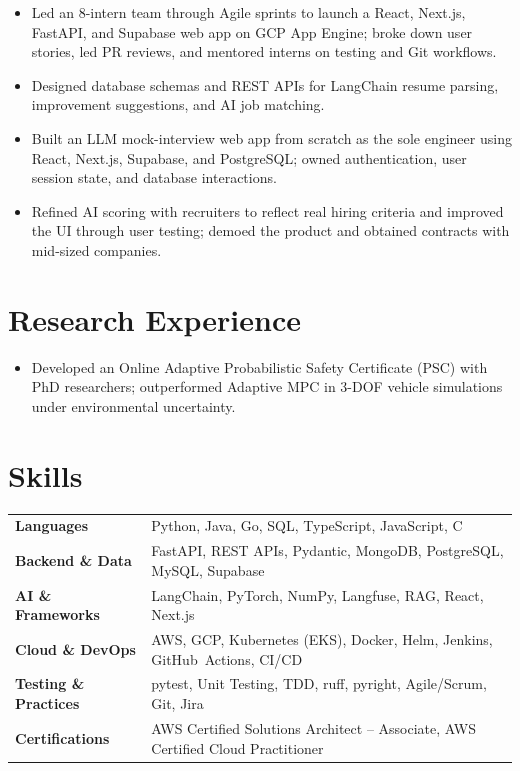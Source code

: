 \documentclass[11pt, letterpaper]{article}
\begin{document}
\begin{itemize}
  \item Led an 8-intern team through Agile sprints to launch a React, Next.js, FastAPI, and Supabase web app on GCP App Engine; broke down user stories, led PR reviews, and mentored interns on testing and Git workflows.
  \item Designed database schemas and REST APIs for LangChain resume parsing, improvement suggestions, and AI job matching.
\end{itemize}

\begin{itemize}
  \item Built an LLM mock-interview web app from scratch as the sole engineer using React, Next.js, Supabase, and PostgreSQL; owned authentication, user session state, and database interactions.
  \item Refined AI scoring with recruiters to reflect real hiring criteria and improved the UI through user testing; demoed the product and obtained contracts with mid-sized companies.
\end{itemize}

\section{Research Experience}
\begin{itemize}
  \item Developed an Online Adaptive Probabilistic Safety Certificate (PSC) with PhD researchers; outperformed Adaptive MPC in 3-DOF vehicle simulations under environmental uncertainty.
\end{itemize}

\section{Skills}
\begin{tabularx}{\textwidth}{@{}l @{\hspace{7pt}} >{\raggedright\arraybackslash}X@{}}
  \textbf{Languages} & Python, Java, Go, SQL, TypeScript, JavaScript, C \\[1pt]
  \textbf{Backend \& Data} & FastAPI, REST APIs, Pydantic, MongoDB, PostgreSQL, MySQL, Supabase \\[1pt]
  \textbf{AI \& Frameworks} & LangChain, PyTorch, NumPy, Langfuse, RAG, React, Next.js \\[1pt]
  \textbf{Cloud \& DevOps} & AWS, GCP, Kubernetes (EKS), Docker, Helm, Jenkins, GitHub~Actions, CI/CD \\[1pt]
  \textbf{Testing \& Practices} & pytest, Unit Testing, TDD, ruff, pyright, Agile/Scrum, Git, Jira \\[1pt]
  \textbf{Certifications} & AWS Certified Solutions Architect -- Associate, AWS Certified Cloud Practitioner \\
\end{tabularx}
\end{document}
